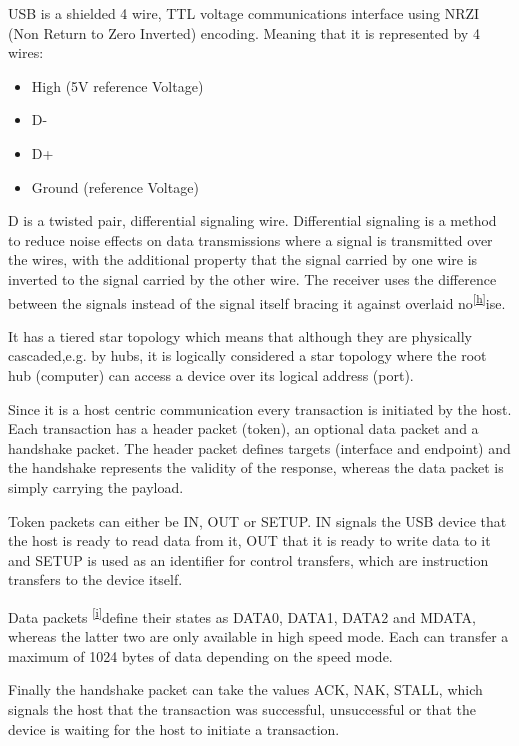 {USB is a shielded 4 wire, TTL voltage communications interface using
NRZI (Non Return to Zero Inverted) encoding. Meaning that it is
represented by 4 wires:}

\begin{itemize}
\tightlist
\item
  {High (5V reference Voltage)}
\item
  {D-}
\item
  {D+}
\item
  {Ground (reference Voltage)}
\end{itemize}

{D is a twisted pair, differ}{ential signaling wire. Differential
signaling is a method to reduce noise effects on data transmissions
where a signal is transmitted over the wires, with the additional
property that the signal carried by one wire is inverted to the signal
carried by the other wire. The receiver uses the difference between the
signals instead of the signal itself bracing it against overlaid
no}\textsuperscript{\protect\hyperlink{cmnt8}{{[}h{]}}}{ise. }

{It has a tiered star topology which means that although they are
physically cascaded,e.g. by hubs, it is logically considered a star
topology where the root hub (computer) can access a device over its
logical address (port). }

{Since it is a host centric communication every transaction is initiated
by the host. Each transaction has a header packet (token), an optional
data packet and a handshake packet. The header packet defines targets
(interface and endpoint) and the handshake represents the validity of
the response, whereas the data packet is simply carrying the payload.}

{Token packets can either be IN, OUT or SETUP. IN signals the USB device
that the host is ready to read data from it, OUT that it is ready to
write data to it and SETUP is used as an identifier for control
transfers, which are instruction transfers to the device itself.}

{Data }{packets
}\textsuperscript{\protect\hyperlink{cmnt9}{{[}i{]}}}{define their
states as DATA0, DATA1, DATA2 and MDATA, whereas the latter two are only
available in high speed mode. Each can transfer a maximum of 1024 bytes
of data depending on the speed mode.}

{Finally the handshake packet can take the values ACK, NAK, STALL, which
signals the host that the transaction was successful, unsuccessful or
that the device is waiting for the host to initiate a transaction.}

